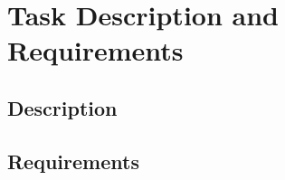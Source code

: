 \section{Task Description and Requirements}\label{Task Description and Requirements} 

    \subsection{Description}\label{Description}        
   
    \subsection{Requirements}\label{Requirements}
